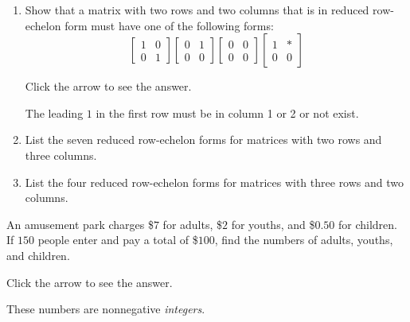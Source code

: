 \documentclass{ximera}
\begin{document}
\begin{problem}\label{prb:2x2rref_forms}

\begin{enumerate}
\item Show that a matrix with two rows and two columns that is in reduced row-echelon form must have one of the following forms:
\begin{equation*}
\begin{bmatrix}
1 & 0 \\
0 & 1
\end{bmatrix}
\begin{bmatrix}
0 & 1 \\
0 & 0
\end{bmatrix}
\begin{bmatrix}
0 & 0 \\
0 & 0
\end{bmatrix}
\begin{bmatrix}
1 & * \\
0 & 0
\end{bmatrix}
\end{equation*}

Click the arrow to see the answer. 
\begin{expandable}
 The leading $1$ in the first row must be in column 1 or 2 or not exist.
\end{expandable}

\item List the seven reduced row-echelon forms for matrices with two rows and three columns.

\item List the four reduced row-echelon forms for matrices with three rows and two columns.

\end{enumerate}
\end{problem}

\begin{problem}\label{prb:amusement}
An amusement park charges \$$7$ for adults, \$$2$ for youths, and \$$0.50$ for
children. If $150$ people enter and pay a total of \$$100$, find the numbers
of adults, youths, and children.

Click the arrow to see the answer. 
\begin{expandable}
These numbers are nonnegative \textit{integers}.
\end{expandable}

\end{problem}
\end{document}
